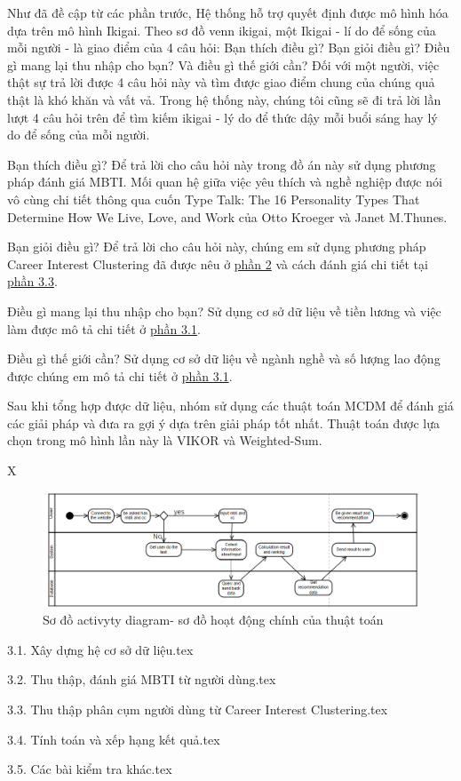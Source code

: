 Như đã đề cập từ các phần trước, Hệ thống hỗ trợ quyết định được 
 mô hình hóa dựa trên mô hình Ikigai. Theo sơ đồ venn ikigai, một Ikigai - lí do để sống của mỗi người - là giao điểm của 4 câu hỏi: Bạn thích điều gì? Bạn giỏi điều gì? Điều gì mang lại thu nhập cho bạn? Và điều gì thế giới cần? Đối với một người, việc thật sự trả lời được 4 câu hỏi này và tìm được giao điểm chung của chúng quả thật là khó khăn và vất vả. Trong hệ thống này, chúng tôi cũng sẽ đi trả lời lần lượt 4 câu hỏi trên để tìm kiếm ikigai - lý do để thức dậy mỗi buổi sáng hay lý do để sống của mỗi người.

Bạn thích điều gì? Để trả lời cho câu hỏi này trong đồ án này sử dụng phương pháp đánh giá MBTI. Mối quan hệ giữa việc yêu thích và nghề nghiệp được nói vô cùng chi tiết thông qua cuốn Type Talk: The 16 Personality Types That Determine How We Live, Love, and Work của Otto Kroeger và Janet M.Thunes.

Bạn giỏi điều gì? Để trả lời cho câu hỏi này, chúng em sử dụng phương pháp Career Interest Clustering đã được nêu ở \hyperref[2]{phần 2} và cách đánh giá chi tiết tại \hyperref[3.3]{phần 3.3}.

Điều gì mang lại thu nhập cho bạn? Sử dụng cơ sở dữ liệu về tiền lương và việc làm được mô tả chi tiết ở \hyperref[3.1]{phần 3.1}.

Điều gì thế giới cần? Sử dụng cơ sở dữ liệu về ngành nghề và số lượng lao động được chúng em mô tả chi tiết ở \hyperref[3.1]{phần 3.1}.

Sau khi tổng hợp được dữ liệu, nhóm sử dụng các thuật toán MCDM để đánh giá các giải pháp và đưa ra gợi ý dựa trên giải pháp tốt nhất. Thuật toán được lựa chọn trong mô hình lần này là VIKOR và Weighted-Sum.

X 

\begin{figure}[H]
        \centering
        \includegraphics[width=0.5\linewidth]{images/activity.png}
        \vspace{0.6cm}
        \caption{Sơ đồ activyty diagram- sơ đồ hoạt động chính của thuật toán}
    \end{figure}

{3.1. Xây dựng hệ cơ sở dữ liệu.tex}

{3.2. Thu thập, đánh giá MBTI từ người dùng.tex}

{3.3. Thu thập phân cụm người dùng từ Career Interest Clustering.tex}

{3.4. Tính toán và xếp hạng kết quả.tex}

{3.5. Các bài kiểm tra khác.tex}